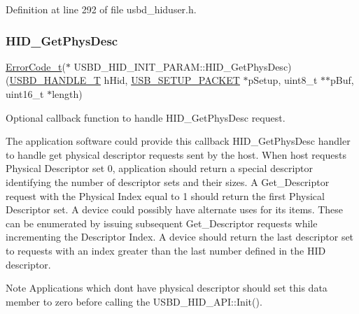 Definition at line 292 of file usbd\+\_\+hiduser.\+h.

\mbox{\label{struct_u_s_b_d___h_i_d___i_n_i_t___p_a_r_a_m_ab2e0f749e7aca1ff28edcf5c8da530a0}} 
\subsubsection{\texorpdfstring{H\+I\+D\+\_\+\+Get\+Phys\+Desc}{HID\_GetPhysDesc}}
{\footnotesize\ttfamily \hyperlink{error_8h_a905255056c349318139d94aa4523d516}{Error\+Code\+\_\+t}($\ast$ U\+S\+B\+D\+\_\+\+H\+I\+D\+\_\+\+I\+N\+I\+T\+\_\+\+P\+A\+R\+A\+M\+::\+H\+I\+D\+\_\+\+Get\+Phys\+Desc) (\hyperlink{group___u_s_b_d___core_gafdbb2204d929cb9d75736bd2b42342ac}{U\+S\+B\+D\+\_\+\+H\+A\+N\+D\+L\+E\+\_\+T} h\+Hid, \hyperlink{group___u_s_b_d___core_ga4a940f7627cc7e9f0bb693cc0fce8637}{U\+S\+B\+\_\+\+S\+E\+T\+U\+P\+\_\+\+P\+A\+C\+K\+ET} $\ast$p\+Setup, uint8\+\_\+t $\ast$$\ast$p\+Buf, uint16\+\_\+t $\ast$length)}

Optional callback function to handle H\+I\+D\+\_\+\+Get\+Phys\+Desc request.

The application software could provide this callback H\+I\+D\+\_\+\+Get\+Phys\+Desc handler to handle get physical descriptor requests sent by the host. When host requests Physical Descriptor set 0, application should return a special descriptor identifying the number of descriptor sets and their sizes. A Get\+\_\+\+Descriptor request with the Physical Index equal to 1 should return the first Physical Descriptor set. A device could possibly have alternate uses for its items. These can be enumerated by issuing subsequent Get\+\_\+\+Descriptor requests while incrementing the Descriptor Index. A device should return the last descriptor set to requests with an index greater than the last number defined in the H\+ID descriptor. \begin{DoxyNote}{Note}
Applications which don\textquotesingle{}t have physical descriptor should set this data member to zero before calling the U\+S\+B\+D\+\_\+\+H\+I\+D\+\_\+\+A\+P\+I\+::\+Init(). ~\newline
 
\end{DoxyNote}

